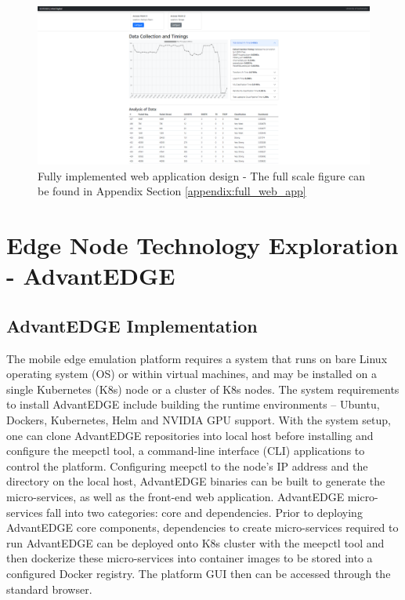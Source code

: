 \begin{figure}[ht]
    \centering
    \includegraphics[width=1\linewidth]{pages/Chapter4/Chapter 4 Images/newWebApp.PNG}
    \caption{Fully implemented web application design - The full scale figure can be found in Appendix Section \ref{appendix:full_web_app}}
    \label{fig:impl_web_app}
\end{figure}


\section{Edge Node Technology Exploration - AdvantEDGE} %
\subsection{AdvantEDGE Implementation}
The mobile edge emulation platform requires a system that runs on bare Linux operating system (OS) or within virtual machines, and may be installed on a single Kubernetes (K8s) node or a cluster of K8s nodes. The system requirements to install AdvantEDGE include building the runtime environments – Ubuntu, Dockers, Kubernetes, Helm and NVIDIA GPU support. With the system setup, one can clone AdvantEDGE repositories into local host before installing and configure the meepctl tool, a command-line interface (CLI) applications to control the platform. 
Configuring meepctl to the node’s IP address and the directory on the local host, AdvantEDGE binaries can be built to generate the micro-services, as well as the front-end web application. AdvantEDGE micro-services fall into two categories: core and dependencies. Prior to deploying AdvantEDGE core components, dependencies to create micro-services required to run AdvantEDGE can be deployed onto K8s cluster with the meepctl tool and then dockerize these micro-services into container images to be stored into a configured Docker registry. The platform GUI then can be accessed through the standard browser.

